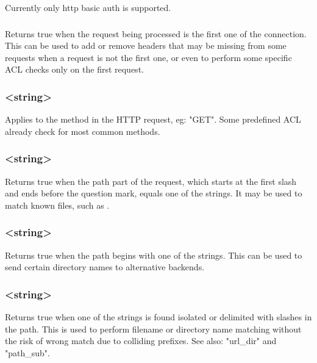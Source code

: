   Currently only http basic auth is supported.

\subsubsection[http\_first\_req]{}

  Returns true when the request being processed is the first one of the
  connection. This can be used to add or remove headers that may be missing
  from some requests when a request is not the first one, or even to perform
  some specific ACL checks only on the first request.

\subsubsection[method]{ <string>}

  Applies to the method in the HTTP request, eg: "GET". Some predefined ACL
  already check for most common methods.

\subsubsection[path]{ <string>}

  Returns true when the path part of the request, which starts at the first
  slash and ends before the question mark, equals one of the strings. It may be
  used to match known files, such as .

\subsubsection[path\_beg]{ <string>}

  Returns true when the path begins with one of the strings. This can be used
  to send certain directory names to alternative backends.

\subsubsection[path\_dir]{ <string>}

  Returns true when one of the strings is found isolated or delimited with
  slashes in the path. This is used to perform filename or directory name
  matching without the risk of wrong match due to colliding prefixes. See also:   "url\_dir" and "path\_sub".

